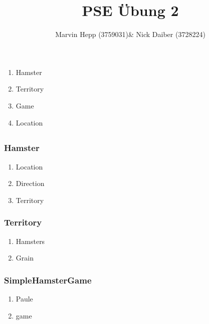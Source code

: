 \documentclass{article}
\title{PSE Übung 2}
\author{Marvin Hepp (3759031)\& Nick Daiber (3728224)}
\begin{document}
    \maketitle
    \section{}
        \subsection{}
            \begin{enumerate}
                \item{Hamster}
                \item{Territory}
                \item{Game}
                \item{Location}
            \end{enumerate}
        \subsection{}
            \subsubsection{Hamster}
                \begin{enumerate}
                    \item{Location}
                    \item{Direction}
                    \item{Territory}
                \end{enumerate}
            \subsubsection{Territory}
                \begin{enumerate}
                    \item{Hamsters}
                    \item{Grain}
                \end{enumerate}
            \subsubsection{SimpleHamsterGame}
                \begin{enumerate}
                    \item{Paule}
                    \item{game}
                \end{enumerate}
\end{document}
